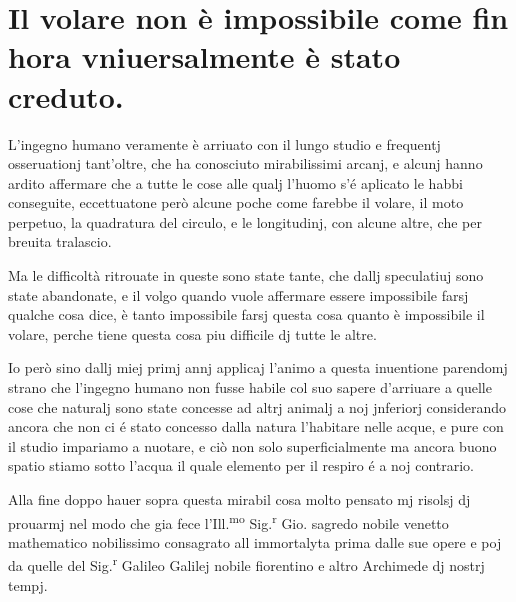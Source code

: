 \documentclass[11pt,a4paper]{article}
\begin{document}

\section*{Il volare non è impossibile come fin hora vniuersalmente è stato creduto.}

L'ingegno humano veramente è arriuato con il lungo studio e frequentj osseruationj tant'oltre, che ha conosciuto mirabilissimi arcanj, e alcunj hanno ardito affermare che a tutte le cose alle qualj l'huomo s'é aplicato le habbi conseguite, eccettuatone però alcune poche come farebbe il volare, il moto perpetuo, la quadratura del circulo, e le longitudinj, con alcune altre, che per breuita tralascio.

Ma le difficoltà ritrouate in queste sono state tante, che dallj speculatiuj sono state abandonate, e il volgo quando vuole affermare essere impossibile farsj qualche cosa dice, è tanto impossibile farsj questa cosa quanto è impossibile il volare, perche tiene questa cosa piu difficile dj tutte le altre.

Io però sino dallj miej primj annj applicaj l'animo a questa inuentione parendomj strano che l'ingegno humano non fusse habile col suo sapere d'arriuare a quelle cose che naturalj sono state concesse ad altrj animalj a noj jnferiorj considerando ancora che non ci é stato concesso dalla natura l'habitare nelle acque, e pure con il studio impariamo a nuotare, e ciò non solo superficialmente ma ancora buono spatio stiamo sotto l'acqua il quale elemento per il respiro é a noj contrario.

Alla fine doppo hauer sopra questa mirabil cosa molto pensato mj risolsj dj prouarmj nel modo che gia fece l'Ill.\textsuperscript{mo} Sig.\textsuperscript{r} Gio.  sagredo nobile venetto mathematico nobilissimo consagrato all immortalyta prima dalle sue opere e poj da quelle del Sig.\textsuperscript{r} Galileo Galilej nobile fiorentino e altro Archimede dj nostrj tempj.
\end{document}
